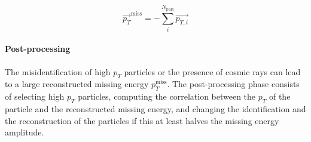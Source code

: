 \begin{equation}
    \vec{p_T}^{\text{miss}}=-\sum_i^{N_{\text{part}}} \vec{p_{T,i}}
\end{equation}

\paragraph*{Post-processing}
The misidentification of high $p_T$ particles or the presence of cosmic rays can lead to a large reconstructed missing energy $p_T^{\text{miss}}$.
The post-processing phase consists of selecting high $p_T$ particles, computing the correlation between the $p_T$ of the particle and the reconstructed missing energy, and changing the identification and the reconstruction of the particles if this at least halves the missing energy amplitude.

